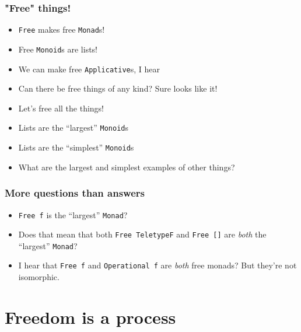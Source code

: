 \documentclass[pdf]{beamer}
\begin{document}
\begin{frame}
  \frametitle{"Free" things!}
  \begin{itemize}
  \item \lstinline{Free} makes free \lstinline{Monad}s! \pause
  \item Free \lstinline{Monoid}s are lists! \pause
  \item We can make free \lstinline{Applicative}s, I hear \pause
  \item Can there be free things of any kind? Sure looks like it! \pause
  \item Let's free all the things!
  \end{itemize}
\end{frame}

\begin{frame}
  \begin{itemize}
  \item Lists are the ``largest'' \lstinline{Monoid}s
  \item Lists are the ``simplest'' \lstinline{Monoid}s \pause
  \item What are the largest and simplest examples of other things?
  \end{itemize}
\end{frame}

\begin{frame}
  \frametitle{More questions than answers}
  \begin{itemize}
  \item \lstinline{Free f} is the ``largest'' \lstinline{Monad}?  \pause
  \item Does that mean that both \lstinline{Free TeletypeF} and
    \lstinline{Free []} are \textit{both} the ``largest'' \lstinline{Monad}?
    \pause
  \item I hear that \lstinline{Free f} and \lstinline{Operational f} are
    \textit{both} free monads? \pause But they're not isomorphic.
  \end{itemize}
\end{frame}


\section{Freedom is a process}
\end{document}
